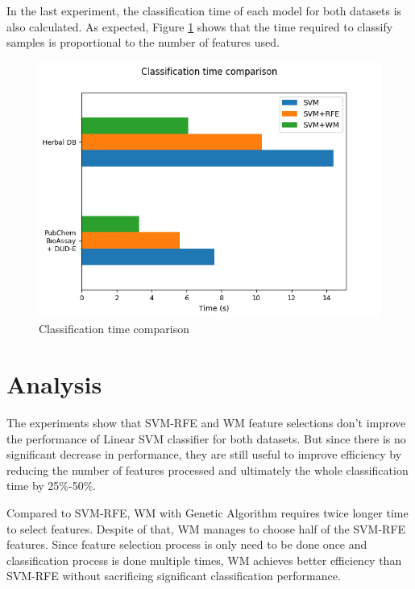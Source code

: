 \documentclass[conference,compsoc,12pt]{IEEEtran}
\begin{document}
	In the last experiment, the classification time of each model for both datasets is also calculated. As expected, Figure \ref{fig_classification_time_comparison} shows that the time required to classify samples is proportional to the number of features used.
		
	\begin{figure}
		\includegraphics[scale=0.5]{../images/classification_time_comparison.png}
		\caption{Classification time comparison}
		\label{fig_classification_time_comparison}
	\end{figure}
	
	\section{Analysis}

	The experiments show that SVM-RFE and WM feature selections don't improve the performance of Linear SVM classifier for both datasets. But since there is no significant decrease in performance, they are still useful to improve efficiency by reducing the number of features processed and ultimately the whole classification time by 25\%-50\%.
	
	Compared to SVM-RFE, WM with Genetic Algorithm requires twice longer time to select features. Despite of that, WM manages to choose half of the SVM-RFE features. Since feature selection process is only need to be done once and classification process is done multiple times, WM achieves better efficiency than SVM-RFE without sacrificing significant classification performance.
		
\end{document}
